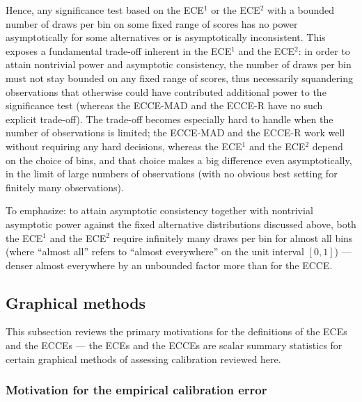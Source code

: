 \documentclass{article}
\begin{document}
Hence, any significance test based on the ECE$^1$ or the ECE$^2$
with a bounded number of draws per bin on some fixed range of scores
has no power asymptotically for some alternatives
or is asymptotically inconsistent.
This exposes a fundamental trade-off inherent in the ECE$^1$ and the ECE$^2$:
in order to attain nontrivial power and asymptotic consistency,
the number of draws per bin must not stay bounded on any fixed range of scores,
thus necessarily squandering observations that otherwise could have
contributed additional power to the significance test
(whereas the ECCE-MAD and the ECCE-R have no such explicit trade-off).
The trade-off becomes especially hard to handle when the number of observations
is limited; the ECCE-MAD and the ECCE-R work well without requiring
any hard decisions, whereas the ECE$^1$ and the ECE$^2$ depend on the choice
of bins, and that choice makes a big difference even asymptotically,
in the limit of large numbers of observations (with no obvious best setting
for finitely many observations).

To emphasize: to attain asymptotic consistency together
with nontrivial asymptotic power against the fixed alternative distributions
discussed above, both the ECE$^1$ and the ECE$^2$ require infinitely many draws 
per bin for almost all bins (where ``almost all'' refers
to ``almost everywhere'' on the unit interval $[0, 1]$)
--- denser almost everywhere by an unbounded factor more than for the ECCE.



\subsection{Graphical methods}
\label{graphical}

This subsection reviews the primary motivations for the definitions
of the ECEs and the ECCEs --- the ECEs and the ECCEs
are scalar summary statistics for certain graphical methods
of assessing calibration reviewed here.


\subsubsection{Motivation for the empirical calibration error}
\label{calibrationplot}
\end{document}
